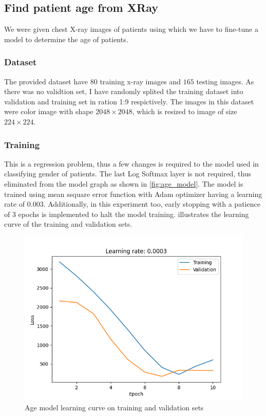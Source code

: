 \subsection{Find patient age from XRay}
\label{sec:warmup4}

    We were given chest X-ray images of patients using which we have to fine-tune a model to determine the age of patients.

\subsubsection{Dataset}
    The provided dataset have $80$ training x-ray images and $165$ testing images. As there was no validtion set, I have randomly splited the training dataset into validation and training set in ration 1:9 respictively. The images in this dataset were color image with shape $2048 \times 2048$, which is resized to image of size $224 \times 224$.

\subsubsection{Training}

    This is a regression problem, thus a few changes is required to the model used in classifying gender of patients. The last Log Softmax layer is not required, thus eliminated from the model graph as shown in \cref{fig:age_model}. The model is trained using mean ssquare error function with Adam optimizer having a learning rate of $0.003$. Additionally, in this experiment too, early stopping with a patience of 3 epochs is implemented to halt the model training.  illustrates the learning curve of the training and validation sets.

    \begin{figure}[htbp]
        \centering
        \includegraphics[width=\linewidth]{../outputs/age/age2/loss-curve.png}
        \caption{Age model learning curve on training and validation sets}
        \label{fig:age-learning-curve}
    \end{figure}

